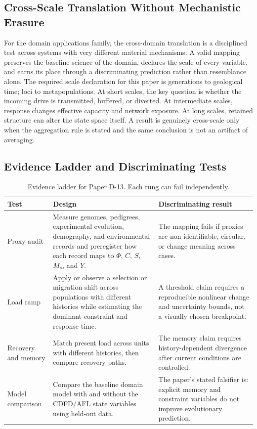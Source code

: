 \documentclass[11pt,a4paper]{article}
\begin{document}
\subsection{Cross-Scale Translation Without Mechanistic Erasure}

For the domain applications family, the cross-domain translation is a disciplined test across systems with very different material mechanisms. A valid mapping preserves the baseline science of the domain, declares the scale of every variable, and earns its place through a discriminating prediction rather than resemblance alone. \cite{Holling1973,Turing1952,Shannon1948,BakTangWiesenfeld1987}
The required scale declaration for this paper is generations to geological time; loci to metapopulations. At short
scales, the key question is whether the incoming drive is transmitted,
buffered, or diverted. At intermediate scales, response changes effective
capacity and network exposure. At long scales, retained structure can alter the
state space itself. A result is genuinely cross-scale only when the aggregation
rule is stated and the same conclusion is not an artifact of averaging.

\subsection{Evidence Ladder and Discriminating Tests}

\begin{table}[htbp]
\centering
\small
\caption{Evidence ladder for Paper D-13. Each rung can fail independently.}
\begin{tabularx}{\textwidth}{|p{}|X|X|}
\hline
\textbf{Test} & \textbf{Design} & \textbf{Discriminating result} \\
\hline
Proxy audit & Measure genomes, pedigrees, experimental evolution, demography, and environmental records and preregister how each record maps to $\Phi$, $C$, $S$, $M_s$, and $Y$. & The mapping fails if proxies are non-identifiable, circular, or change meaning across cases. \\
\hline
Load ramp & Apply or observe a selection or migration shift across populations with different histories while estimating the dominant constraint and response time. & A threshold claim requires a reproducible nonlinear change and uncertainty bounds, not a visually chosen breakpoint. \\
\hline
Recovery and memory & Match present load across units with different histories, then compare recovery paths. & The memory claim requires history-dependent divergence after current conditions are controlled. \\
\hline
Model comparison & Compare the baseline domain model with and without the CDFD/AFL state variables using held-out data. & The paper's stated falsifier is: explicit memory and constraint variables do not improve evolutionary prediction. \\
\hline
\end{tabularx}
\end{table}
\end{document}
